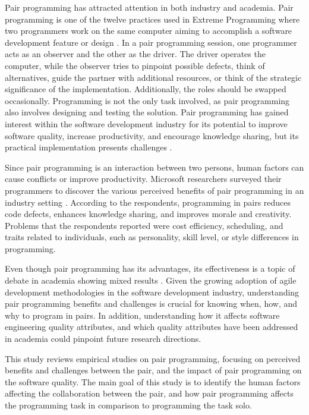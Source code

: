 \documentclass[conference]{IEEEtran}
\begin{document}
Pair programming has attracted attention in both industry and academia. Pair programming is one of the twelve practices used in Extreme Programming where two programmers work on the same computer aiming to accomplish a software development feature or design \cite{10.5555/1076267}. In a pair programming session, one programmer acts as an observer and the other as the driver. The driver operates the computer, while the observer tries to pinpoint possible defects, think of alternatives, guide the partner with additional resources, or think of the strategic significance of the implementation. Additionally, the roles should be swapped occasionally. Programming is not the only task involved, as pair programming also involves designing and testing the solution. Pair programming has gained interest within the software development industry for its potential to improve software quality, increase productivity, and encourage knowledge sharing, but its practical implementation presents challenges \cite{10.1145/2652524.2652529, Williams2000Strengthening}.

Since pair programming is an interaction between two persons, human factors can cause conflicts or improve productivity. Microsoft researchers surveyed their programmers to discover the various perceived benefits of pair programming in an industry setting \cite{10.1145/1414004.1414026}. According to the respondents, programming in pairs reduces code defects, enhances knowledge sharing, and improves morale and creativity. Problems that the respondents reported were cost efficiency, scheduling, and traits related to individuals, such as personality, skill level, or style differences in programming. 

Even though pair programming has its advantages, its effectiveness is a topic of debate in academia showing mixed results \cite{Hannay2009effectiveness}. Given the growing adoption of agile development methodologies in the software development industry, understanding pair programming benefits and challenges is crucial for knowing when, how, and why to program in pairs. In addition, understanding how it affects software engineering quality attributes, and which quality attributes have been addressed in academia could pinpoint future research directions.

This study reviews empirical studies on pair programming, focusing on perceived benefits and challenges between the pair, and the impact of pair programming on the software quality. The main goal of this study is to identify the human factors affecting the collaboration between the pair, and how pair programming affects the programming task in comparison to programming the task solo.
\end{document}
